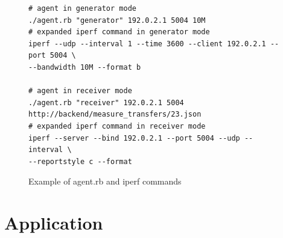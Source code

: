 \begin{figure}[htb]
\caption{Example of agent.rb and iperf commands}
\label{code:fw}
\begin{verbatim}
# agent in generator mode
./agent.rb "generator" 192.0.2.1 5004 10M
# expanded iperf command in generator mode
iperf --udp --interval 1 --time 3600 --client 192.0.2.1 --port 5004 \
--bandwidth 10M --format b
	
# agent in receiver mode
./agent.rb "receiver" 192.0.2.1 5004 http://backend/measure_transfers/23.json
# expanded iperf command in receiver mode
iperf --server --bind 192.0.2.1 --port 5004 --udp --interval \
--reportstyle c --format
\end{verbatim}
\end{figure}


\section{Application}


